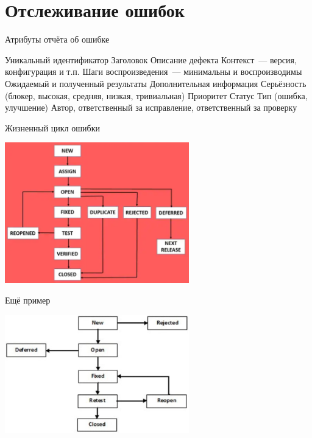 \documentclass{../../slides-style}
\begin{document}
    \section{Отслеживание ошибок}

    \begin{frame}{Атрибуты отчёта об ошибке}
        \begin{outline}
            \1 Уникальный идентификатор
            \1 Заголовок
            \1 Описание дефекта
                \2 Контекст~--- версия, конфигурация и т.п.
                \2 Шаги воспроизведения~--- минимальны и воспроизводимы
                \2 Ожидаемый и полученный результаты
                \2 Дополнительная информация
            \1 Серьёзность (блокер, высокая, средняя, низкая, тривиальная)
            \1 Приоритет
            \1 Статус
            \1 Тип (ошибка, улучшение)
            \1 Автор, ответственный за исправление, ответственный за проверку
        \end{outline}
    \end{frame}

    \begin{frame}{Жизненный цикл ошибки}
        \begin{center}
            \includegraphics[width=0.6\textwidth]{bugLifecycle1.png}
        \end{center}
    \end{frame}

    \begin{frame}{Ещё пример}
        \begin{center}
            \includegraphics[width=0.6\textwidth]{bugLifecycle2.png}
        \end{center}
    \end{frame}
\end{document}

